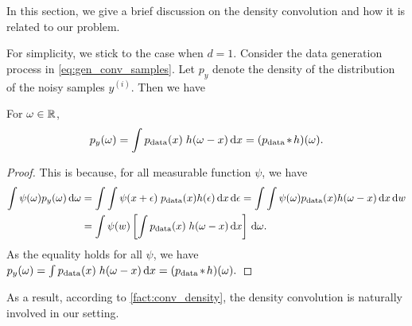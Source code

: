 In this section, we give a brief discussion on the density convolution and how it is related to our problem. 

For simplicity, we stick to the case when $d = 1$. Consider the data generation process in \cref{eq:gen_conv_samples}. Let $p_y$ denote the density of the distribution of the noisy samples $y^{(i)}$. Then we have 
\begin{fact}
\label{fact:conv_density}
For $\omega \in \mathbb{R}$, 
\begin{align}
	p_y(\omega) = \int p_\text{data}(x) \; h(\omega-x) \,\mathrm{d} x = (p_\text{data} \hspace{-0.1em}*\hspace{-0.1em} h) (\omega).
\end{align} 
\end{fact}
\begin{proof}
	This is because, for all measurable function $\psi$, we have
\begin{align*}
	\int \psi(\omega) p_y(\omega) \,\mathrm{d} \omega &= \int \int \psi(x+\epsilon) \; p_\text{data}(x) h(\epsilon) \,\mathrm{d} x \,\mathrm{d} \epsilon = \int \int \psi(\omega) p_\text{data}(x) h(\omega-x) \,\mathrm{d} x \,\mathrm{d} w\\
	&= \int \psi(w) \left[\int p_\text{data}(x) \; h(\omega - x) \,\mathrm{d} x \right]\,\mathrm{d} \omega. 
\end{align*}
As the equality holds for all $\psi$, we have
\(
	p_y(\omega) = \int p_\text{data}(x) \; h(\omega-x) \,\mathrm{d} x = (p_\text{data} \hspace{-0.1em}*\hspace{-0.1em} h) (\omega).
\)
\end{proof}
As a result, according to \cref{fact:conv_density}, the density convolution is naturally involved in our setting.

